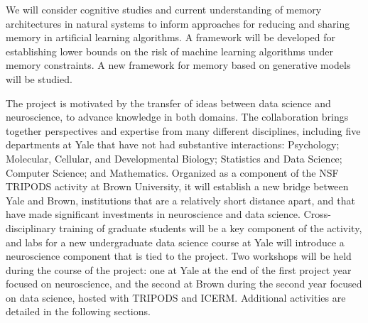 We will consider cognitive studies and
current understanding of memory architectures in natural systems
to inform approaches for reducing and sharing memory in
artificial learning algorithms. A framework will be developed for
establishing lower bounds on the risk of machine learning algorithms under
memory constraints. A new framework for memory based on generative models
will be studied.
\vskip5pt

The project is motivated by the transfer of ideas between data science
and neuroscience, to advance knowledge in both domains. The
collaboration brings together perspectives and expertise from many
different disciplines, including five departments at Yale that have
not had substantive interactions: Psychology; Molecular, Cellular, and
Developmental Biology; Statistics and Data Science; Computer Science; and
Mathematics. Organized as a component of the NSF TRIPODS activity at
Brown University, it will establish a new bridge between Yale and
Brown, institutions that are a relatively short distance apart, and
that have made significant investments in neuroscience and data
science. Cross-disciplinary training of graduate students will be a
key component of the activity, and labs for a new undergraduate data
science course at Yale will introduce a neuroscience component that is
tied to the project.  Two workshops will be held during the course of
the project: one at Yale at the end of the first project year focused on neuroscience,
and the second at Brown during the second year focused on data science, hosted with 
TRIPODS and ICERM. Additional activities are detailed in the following sections.




